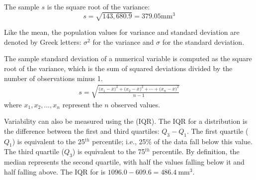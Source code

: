 The sample  $s$ is the square root of the variance:
$$s=\sqrt{143,680.9} = 379.05 \textrm{mm}^{3}$$

Like the mean, the population values for variance and standard deviation are denoted by Greek letters:
$\sigma_{}^2$ for the variance and $\sigma$ for the standard deviation.


\begin{termBox}{
		The sample standard deviation of a numerical variable is computed as the square root of the variance, which is the sum of squared deviations divided by the number of observations minus 1.
		\begin{eqnarray}
		s = \sqrt{\frac{({x_1 - \overline{x})}^{2}+({x_2 - \overline{x})}^{2}+\cdots+({x_n - \overline{x})}^{2}}{n-1}}
		\label{SDEquation}
		\end{eqnarray}
		where $x_1, x_2, \dots, x_n$ represent the $n$ observed values.}
\end{termBox}

Variability can also be measured using the  (IQR). The IQR for a distribution is the difference between the first and third quartiles: $Q_3 - Q_1$. The first quartile ($Q_1$) is equivalent to the 25$^{th}$ percentile; i.e., 25\% of the data fall below this value. The third quartile ($Q_3$) is equivalent to the 75$^{th}$ percentile. By definition, the median represents the second quartile, with half the values falling below it and half falling above. The IQR for  is $1096.0 - 609.6 = 486.4\ \textrm{mm}^{3}$.  

